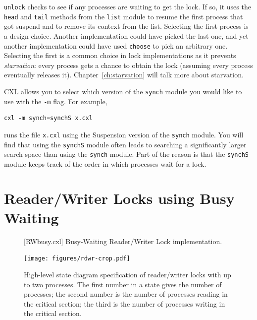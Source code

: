 \documentclass{report}
\newenvironment{code}{
\tcolorbox
}{
\endtcolorbox
}
\begin{document}
\texttt{unlock} checks to see if any processes are waiting to get the lock.
If so, it uses the \texttt{head} and \texttt{tail}
methods from the \texttt{list} module to resume the first process that got
suspend and to remove its context from the list.
Selecting the first process is a design choice.  Another implementation could
have picked the last one, and yet another implementation could have used
\texttt{choose} to pick an arbitrary one.  Selecting the first is a common
choice in lock implementations as it prevents \emph{starvation}:
every process
gets a chance to obtain the lock (assuming every process eventually releases
it).  Chapter~\ref{ch:starvation} will talk more about starvation.

CXL allows you to select which version of the \texttt{synch} module you would
like to use with the \texttt{-m} flag.
For example,

\begin{code}
\begin{verbatim}
cxl -m synch=synchS x.cxl
\end{verbatim}
\end{code}

runs the file \texttt{x.cxl} using the Suspension version of the \texttt{synch} module.
You will find that using the \texttt{synchS} module often leads to searching a
significantly larger search space than using the \texttt{synch} module.
Part of the reason is that the \texttt{synchS} module keeps track of the order
in which processes wait for a lock.

\chapter{Reader/Writer Locks using Busy Waiting}
\label{ch:rdwrbusy}

\begin{figure}
\begin{code}
\end{code}
\caption{[RWbusy.cxl] Busy-Waiting Reader/Writer Lock implementation.}
\label{fig:rwbusy}
\end{figure}

\begin{figure}
\begin{center}
\texttt{[image: figures/rdwr-crop.pdf]}
\end{center}
\caption{High-level state diagram specification of reader/writer locks with
up to two processes.
The first number in a state gives the number of processes; the second number is the
number of processes reading in the critical section; the third is the number of
processes writing in the critical section.}
\label{fig:rdwr}
\end{figure}
\end{document}
